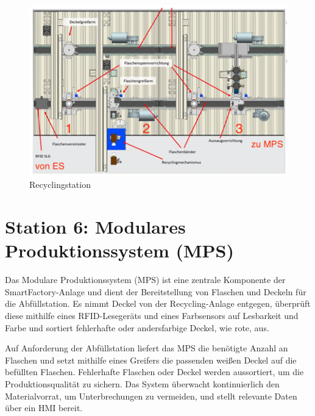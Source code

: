 \begin{figure}[h!]
    \centering
    \includegraphics*{figures/recyclingstation.png}
    \caption{Recyclingstation\cite{siemens2022}} %
    \label{fig:Recycling} %
\end{figure}
\FloatBarrier

\section{Station 6: Modulares Produktionssystem (MPS)}\label{sec:Station 6: Modulares Produktionssystem}

Das Modulare Produktionssystem (MPS) ist eine zentrale Komponente der SmartFactory-Anlage und dient der Bereitstellung von Flaschen und 
Deckeln für die Abfüllstation. Es nimmt Deckel von der Recycling-Anlage entgegen, überprüft diese mithilfe eines RFID-Lesegeräts und 
eines Farbsensors auf Lesbarkeit und Farbe und sortiert fehlerhafte oder andersfarbige Deckel, wie rote, aus.

Auf Anforderung der Abfüllstation liefert das MPS die benötigte Anzahl an Flaschen und setzt mithilfe eines Greifers die passenden weißen 
Deckel auf die befüllten Flaschen. Fehlerhafte Flaschen oder Deckel werden aussortiert, um die Produktionsqualität zu sichern. Das System 
überwacht kontinuierlich den Materialvorrat, um Unterbrechungen zu vermeiden, und stellt relevante Daten über ein HMI bereit. 


